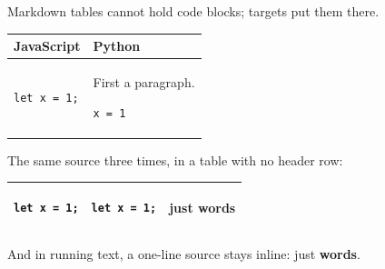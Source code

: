 Markdown tables cannot hold code blocks; targets put them there.

\begin{tabular}{ll}
\toprule
JavaScript & Python \\
\midrule
\begin{minipage}[t]{\dimexpr\linewidth/2-2\tabcolsep\relax}
\begin{verbatim}
let x = 1;
\end{verbatim}
\end{minipage} & \begin{minipage}[t]{\dimexpr\linewidth/2-2\tabcolsep\relax}
First a paragraph.

\begin{verbatim}
x = 1
\end{verbatim}
\end{minipage} \\
\bottomrule
\end{tabular}

The same source three times, in a table with no header row:

\begin{tabular}{lll}
\toprule
\begin{minipage}[t]{\dimexpr\linewidth/3-2\tabcolsep\relax}
\begin{verbatim}
let x = 1;
\end{verbatim}
\end{minipage} & \begin{minipage}[t]{\dimexpr\linewidth/3-2\tabcolsep\relax}
\begin{verbatim}
let x = 1;
\end{verbatim}
\end{minipage} & just \textbf{words} \\
\bottomrule
\end{tabular}

And in running text, a one-line source stays inline: just \textbf{words}.

